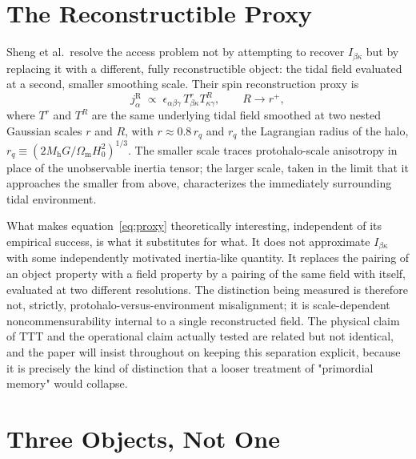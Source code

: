 \documentclass[11pt]{article}
\begin{document}
\section{The Reconstructible Proxy}

Sheng et al.\ resolve the access problem not by attempting to recover $I_{\beta\kappa}$ but by replacing it with a different, fully reconstructible object: the tidal field evaluated at a second, smaller smoothing scale. Their spin reconstruction proxy is
\begin{equation}
j^{\mathrm R}_\alpha \;\propto\; \epsilon_{\alpha\beta\gamma}\, T^{r}_{\beta\kappa} T^{R}_{\kappa\gamma}, \qquad R \to r^{+},
\label{eq:proxy}
\end{equation}
where $T^{r}$ and $T^{R}$ are the same underlying tidal field smoothed at two nested Gaussian scales $r$ and $R$, with $r \approx 0.8\,r_q$ and $r_q$ the Lagrangian radius of the halo, $r_q \equiv (2 M_{\mathrm h} G / \Omega_{\mathrm m} H_0^2)^{1/3}$. The smaller scale traces protohalo-scale anisotropy in place of the unobservable inertia tensor; the larger scale, taken in the limit that it approaches the smaller from above, characterizes the immediately surrounding tidal environment.

What makes equation~\eqref{eq:proxy} theoretically interesting, independent of its empirical success, is what it substitutes for what. It does not approximate $I_{\beta\kappa}$ with some independently motivated inertia-like quantity. It replaces the pairing of an object property with a field property by a pairing of the same field with itself, evaluated at two different resolutions. The distinction being measured is therefore not, strictly, protohalo-versus-environment misalignment; it is scale-dependent noncommensurability internal to a single reconstructed field. The physical claim of TTT and the operational claim actually tested are related but not identical, and the paper will insist throughout on keeping this separation explicit, because it is precisely the kind of distinction that a looser treatment of "primordial memory" would collapse.

\section{Three Objects, Not One}
\end{document}
